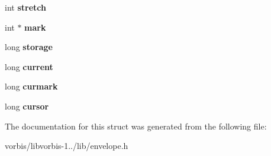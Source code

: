 \begin{DoxyCompactItemize}
\item 
\hypertarget{structenvelope__lookup_af12cc9298483d0d8a8d271d4f24b3ee7}{int {\bfseries stretch}}\label{structenvelope__lookup_af12cc9298483d0d8a8d271d4f24b3ee7}

\item 
\hypertarget{structenvelope__lookup_a6f29d293e9145cc273c743b88e780639}{int $\ast$ {\bfseries mark}}\label{structenvelope__lookup_a6f29d293e9145cc273c743b88e780639}

\item 
\hypertarget{structenvelope__lookup_aab813e353366d427ac743660ad963f9d}{long {\bfseries storage}}\label{structenvelope__lookup_aab813e353366d427ac743660ad963f9d}

\item 
\hypertarget{structenvelope__lookup_a0b641f4d66293a18307e697b5e89892f}{long {\bfseries current}}\label{structenvelope__lookup_a0b641f4d66293a18307e697b5e89892f}

\item 
\hypertarget{structenvelope__lookup_a9fb4f0c6d5414f1de4a272dd9cb06de0}{long {\bfseries curmark}}\label{structenvelope__lookup_a9fb4f0c6d5414f1de4a272dd9cb06de0}

\item 
\hypertarget{structenvelope__lookup_a2c2c6e6d135b636d66a1c7f44a40b4d7}{long {\bfseries cursor}}\label{structenvelope__lookup_a2c2c6e6d135b636d66a1c7f44a40b4d7}

\end{DoxyCompactItemize}


The documentation for this struct was generated from the following file\+:\begin{DoxyCompactItemize}
\item 
vorbis/libvorbis-\/1../lib/envelope.\+h\end{DoxyCompactItemize}
